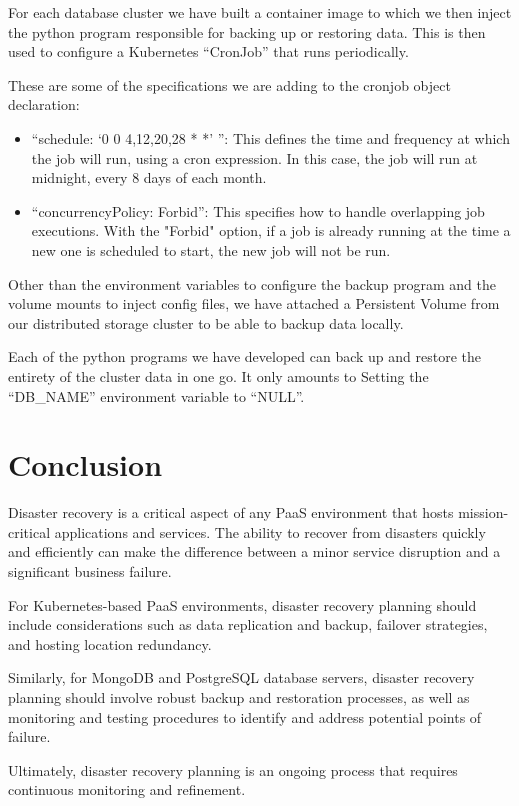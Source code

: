 For each database cluster we have built a container image to which we then inject the python program responsible for backing up or restoring data. This is then used to configure a Kubernetes “CronJob” that runs periodically.

These are some of the specifications we are adding to the cronjob object declaration: 
\begin{itemize}[label={--}]
\item “schedule: ‘0 0 4,12,20,28 * *’ ”: This defines the time and frequency at which the job will run, using a cron expression. In this case, the job will run at midnight, every 8 days of each month. 
\item  “concurrencyPolicy: Forbid”: This specifies how to handle overlapping job executions. With the "Forbid" option, if a job is already running at the time a new one is scheduled to start, the new job will not be run. 
\end{itemize}

Other than the environment variables to configure the backup program and the volume mounts to inject config files, we have attached a Persistent Volume from our distributed storage cluster to be able to backup data locally. 

Each of the python programs we have developed can back up and restore the entirety of the cluster data in one go. It only amounts to Setting the “DB\_NAME” environment variable to “NULL”. 

\section*{Conclusion}
Disaster recovery is a critical aspect of any PaaS environment that hosts mission-critical applications and services. The ability to recover from disasters quickly and efficiently can make the difference between a minor service disruption and a significant business failure. 

For Kubernetes-based PaaS environments, disaster recovery planning should include considerations such as data replication and backup, failover strategies, and hosting location redundancy.  

Similarly, for MongoDB and PostgreSQL database servers, disaster recovery planning should involve robust backup and restoration processes, as well as monitoring and testing procedures to identify and address potential points of failure.  

Ultimately, disaster recovery planning is an ongoing process that requires continuous monitoring and refinement. 